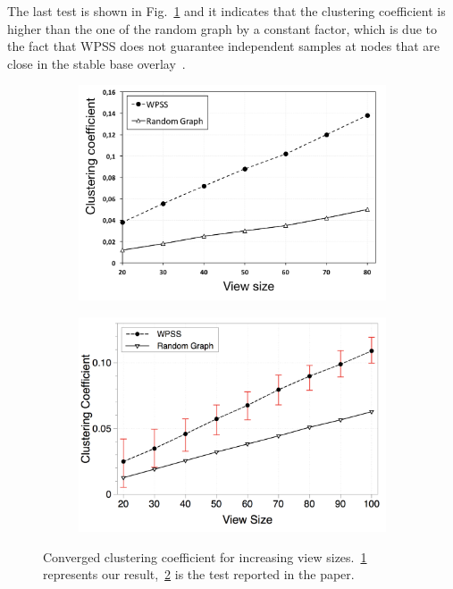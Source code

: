 The last test is shown in Fig.~\ref{fig:converged_clustering_coefficient} and it indicates that the clustering coefficient is higher than the one of the random graph by a constant factor, which is due to the fact that WPSS does not guarantee independent samples at nodes that are close in the stable base overlay~\cite{wormhole}.

\begin{figure}
\centering
\begin{subfigure}{.5\textwidth}
  \centering
  \includegraphics[keepaspectratio=true, width=1\linewidth]{images/converged_clustering_coefficient}
  \caption{}
  \label{fig:converged_clustering_coefficient}
\end{subfigure}%
\begin{subfigure}{.5\textwidth}
  \centering
  \includegraphics[keepaspectratio=true, width=1\linewidth]{images/paper_converged_clustering_coefficient}
  \caption{}
  \label{fig:paper_converged_clustering_coefficient}
\end{subfigure}
\caption{Converged clustering coefficient for increasing view sizes.~\ref{fig:converged_clustering_coefficient} represents our result,~\ref{fig:paper_converged_clustering_coefficient} is the test reported in the paper.}
\label{fig:randomness_conv_clustering}
\end{figure}

